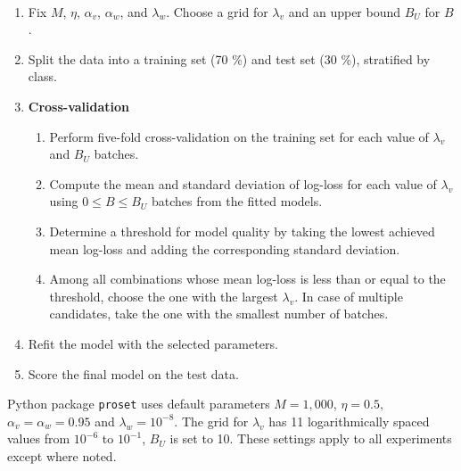 \begin{algorithm}~
\label{alg_hyperparameters_updated}
%
\begin{enumerate}
\item Fix $M$, $\eta$, $\alpha_v$, $\alpha_w$, and $\lambda_w$.
Choose a grid for $\lambda_v$ and an upper bound $B_U$ for $B$.
%
\item Split the data into a training set (70 \%) and test set (30 \%), stratified by class.
%
\item\textbf{Cross-validation}
%
\begin{enumerate}
\item Perform five-fold cross-validation on the training set for each value of $\lambda_v$ and $B_U$ batches.
%
\item Compute the mean and standard deviation of log-loss for each value of $\lambda_v$ using $0\leq B\leq B_U$ batches from the fitted models.
%
\item Determine a threshold for model quality by taking the lowest achieved mean log-loss and adding the corresponding standard deviation.
%
\item Among all combinations whose mean log-loss is less than or equal to the threshold, choose the one with the largest $\lambda_v$.
In case of multiple candidates, take the one with the smallest number of batches.
\end{enumerate}
%
\item Refit the model with the selected parameters.
%
\item Score the final model on the test data.
\end{enumerate}
\end{algorithm}
%
Python package \texttt{proset} uses default parameters $M=1,000$, $\eta=0.5$, $\alpha_v=\alpha_w=0.95$ and $\lambda_w=10^{-8}$.
The grid for $\lambda_v$ has 11 logarithmically spaced values from $10^{-6}$ to $10^{-1}$, $B_U$ is set to 10.
These settings apply to all experiments except where noted.\par
%
